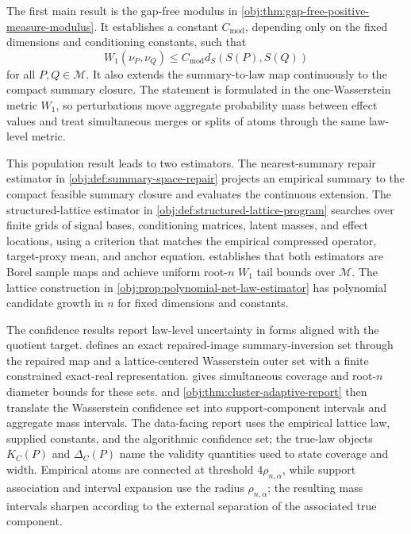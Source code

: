 \documentclass[11pt]{article}
\begin{document}
The first main result is the gap-free modulus in \cref{obj:thm:gap-free-positive-measure-modulus}.  It establishes a constant \(C_{\mathrm{mod}}\), depending only on the fixed dimensions and conditioning constants, such that
\[
W_1(\nu_P,\nu_Q)\le C_{\mathrm{mod}}d_S(S(P),S(Q))
\]
for all \(P,Q\in\mathcal M\).  It also extends the summary-to-law map continuously to the compact summary closure.  The statement is formulated in the one-Wasserstein metric \(W_1\), so perturbations move aggregate probability mass between effect values and treat simultaneous merges or splits of atoms through the same law-level metric.

This population result leads to two estimators.  The nearest-summary repair estimator in \cref{obj:def:summary-space-repair} projects an empirical summary to the compact feasible summary closure and evaluates the continuous extension.  The structured-lattice estimator in \cref{obj:def:structured-lattice-program} searches over finite grids of signal bases, conditioning matrices, latent masses, and effect locations, using a criterion that matches the empirical compressed operator, target-proxy mean, and anchor equation.   establishes that both estimators are Borel sample maps and achieve uniform root-\(n\) \(W_1\) tail bounds over \(\mathcal M\).  The lattice construction in \cref{obj:prop:polynomial-net-law-estimator} has polynomial candidate growth in \(n\) for fixed dimensions and constants.

The confidence results report law-level uncertainty in forms aligned with the quotient target.   defines an exact repaired-image summary-inversion set through the repaired map and a lattice-centered Wasserstein outer set with a finite constrained exact-real representation.   gives simultaneous coverage and root-\(n\) diameter bounds for these sets.   and \cref{obj:thm:cluster-adaptive-report} then translate the Wasserstein confidence set into support-component intervals and aggregate mass intervals.  The data-facing report uses the empirical lattice law, supplied constants, and the algorithmic confidence set; the true-law objects \(K_C(P)\) and \(\Delta_C(P)\) name the validity quantities used to state coverage and width.  Empirical atoms are connected at threshold \(4\rho_{n,\alpha}\), while support association and interval expansion use the radius \(\rho_{n,\alpha}\); the resulting mass intervals sharpen according to the external separation of the associated true component.
\end{document}
